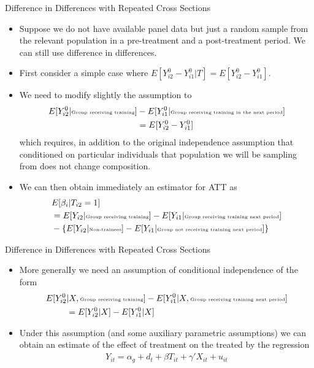 \begin{frame}{Difference in Differences with Repeated Cross Sections}
\begin{itemize}
\item Suppose we do not have available panel data but just a random sample from the relevant population in a pre-treatment and a post-treatment period. We can still use difference in differences.
\item First consider a simple case where {\small $E[Y_{i2}^0- Y_{i1}^0 | T] = E[Y_{i2}^0- Y_{i1}^0]$}.
\item We need to modify slightly the assumption to
\vspace{-.5pc}
\begin{align*}
E[Y_{i2}^0| \text{\tiny Group receiving training}]&-E[Y_{i1}^0| \text{\tiny Group receiving training in the next period}] \\
&= E[Y_{i2}^0-Y_{i1}^0]  
\end{align*}
which requires, in addition to the original independence
assumption that conditioned on particular individuals that population we will be sampling from does not change composition.
\item We can then obtain immediately an estimator for ATT as
\begin{align*}
&E[\beta_i |T_{i2}=1] \\ 
&= E[Y_{i2}| \text{\tiny Group receiving training}]-E[Y_{i1}| \text{\tiny Group receiving training next period}] \\
&- \{E[Y_{i2} | \text{\tiny Non-trainees}] - E[Y_{i1} | \text{\tiny Group not receiving training next period}]\}
\end{align*}
\end{itemize}
\end{frame}


\begin{frame}{Difference in Differences with Repeated Cross Sections}
\begin{itemize}
\item More generalIy we need an assumption of conditional independence of the form
\begin{align*}
E[Y_{i2}^0 & | X, \text{\tiny Group receiving training}]-E[Y_{i1}^0| X, \text{\tiny Group receiving training next period}] \\
&= E[Y_{i2}^0 | X] - E[Y_{i1}^0 |X]
\end{align*}
\item Under this assumption (and some auxiliary parametric assumptions) we can obtain an estimate of the effect of treatment on the treated by the regression
\begin{align*}
Y_{it} = \alpha_g + d_t + \beta T_{it} + \gamma' X_{it} + u_{it}
\end{align*} 
\end{itemize}
\end{frame}

